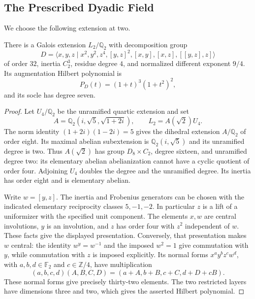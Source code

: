 \subsection{The Prescribed Dyadic Field}
We choose the following extension at two.
\begin{lemma}\label{tw:new-local-two}
There is a Galois extension $L_2/\mathbb Q_2$ with decomposition group
\[
 D=\langle x,y,z\mid x^2,y^2,z^4,[y,z]^2,
                  [x,y],[x,z],[[y,z],z]\rangle
\]
of order $32$, inertia $C_2^3$, residue degree $4$, and normalized
different exponent $9/4$. Its augmentation Hilbert polynomial is
\[
 P_D(t)=(1+t)^3(1+t^2)^2,
\]
and its socle has degree seven.
\end{lemma}
\begin{proof}
Let $U_4/\mathbb Q_2$ be the unramified quartic extension and set
\[
 A=\mathbb Q_2(i,\sqrt5,\sqrt{1+2i}),\qquad
 L_2=A(\sqrt2)U_4.
\]
The norm identity $(1+2i)(1-2i)=5$ gives the dihedral extension
$A/\mathbb Q_2$ of order eight. Its maximal abelian subextension is
$\mathbb Q_2(i,\sqrt5)$ and its unramified degree is two. Thus
$A(\sqrt2)$ has group $D_8\times C_2$, degree sixteen, and unramified
degree two: its elementary abelian abelianization cannot have a cyclic
quotient of order four. Adjoining $U_4$ doubles the degree and the
unramified degree. Its inertia has order eight and is elementary abelian.

Write $w=[y,z]$. The inertia and Frobenius generators can be chosen with
the indicated elementary reciprocity classes $5,-1,-2$. In particular
$z$ is a lift of a uniformizer with the specified unit component.
The elements $x,w$ are central involutions, $y$ is an involution, and
$z$ has order four with $z^2$ independent of $w$. These facts give the
displayed presentation. Conversely, that presentation makes $w$ central:
the identity $w^y=w^{-1}$ and the imposed $w^2=1$ give commutation with
$y$, while commutation with $z$ is imposed explicitly. Its normal forms
$x^a y^b z^c w^d$, with $a,b,d\in\mathbb F_2$ and
$c\in\mathbb Z/4$, have multiplication
\[
 (a,b,c,d)(A,B,C,D)=(a+A,b+B,c+C,d+D+cB).
\]
These normal forms give precisely thirty-two elements. The two
restricted layers have dimensions three and two, which gives the
asserted Hilbert polynomial.


\end{proof}
